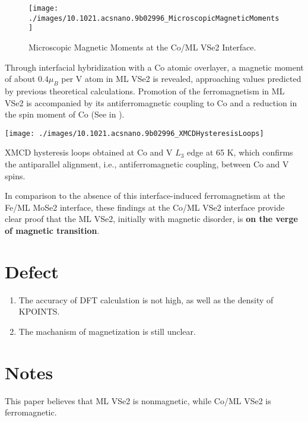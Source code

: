 \begin{figure}[ht] 
    \texttt{[image: ./images/10.1021.acsnano.9b02996\_MicroscopicMagneticMoments]}
	\caption[Microscopic Magnetic Moments at the Co/ML VSe2 Interface]{
        Microscopic Magnetic Moments at the Co/ML VSe2 Interface.
	}
\end{figure}

Through interfacial hybridization with a Co atomic overlayer, a magnetic moment of about $0.4 \mu_B$ per V atom in ML VSe2 is revealed, approaching values predicted by previous theoretical calculations. Promotion of the ferromagnetism in ML VSe2 is accompanied by its antiferromagnetic coupling to Co and a reduction in the spin moment of Co (See in ). 

\begin{marginfigure}
    \texttt{[image: ./images/10.1021.acsnano.9b02996\_XMCDHysteresisLoops]}
	\caption[XMCD hysteresis loops obtained at Co and V $L_3$ edge at 65 K]{
        XMCD hysteresis loops obtained at Co and V $L_3$ edge at 65 K, which confirms the antiparallel alignment, i.e., antiferromagnetic coupling, between Co and V spins.
	}
\end{marginfigure}

In comparison to the absence of this interface-induced ferromagnetism at the Fe/ML MoSe2 interface, these findings at the Co/ML VSe2 interface provide clear proof that the ML VSe2, initially with magnetic disorder, is \textbf{on the verge of magnetic transition}.

\section{Defect}
\begin{enumerate}
    \item The accuracy of DFT calculation is not high, as well as the density of KPOINTS.
    \item The machanism of magnetization is still unclear.
\end{enumerate}

\section{Notes}
This paper believes that ML VSe2 is nonmagnetic, while Co/ML VSe2 is ferromagnetic.